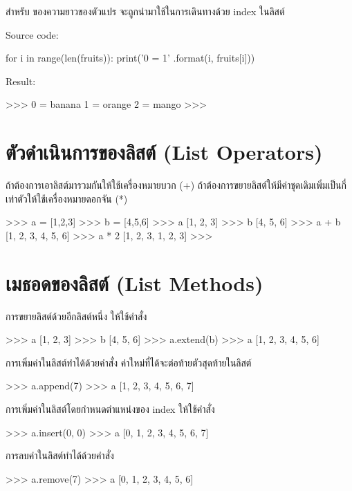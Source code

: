 สำหรับ   ของความยาวของตัวแปร จะถูกนำมาใช้ในการเดินทางด้วย index ในลิสต์

Source code:
\begin{codelist}{}{}
for i in range(len(fruits)):
    print('{0} = {1}' .format(i, fruits[i]))
\end{codelist}

Result:
\begin{codelist}{}{}
>>>
0 = banana
1 = orange
2 = mango
>>>
\end{codelist}

\section{ตัวดำเนินการของลิสต์ (List Operators)}

ถ้าต้องการเอาลิสต์มารวมกันให้ใช้เครื่องหมายบวก (+) ถ้าต้องการขยายลิสต์ให้มีค่าชุดเดิมเพิ่มเป็นกี่เท่าตัวให้ใช้เครื่องหมายดอกจัน (*)

\begin{codelist}{}{}
>>> a = [1,2,3]
>>> b = [4,5,6]
>>> a
[1, 2, 3]
>>> b
[4, 5, 6]
>>> a + b
[1, 2, 3, 4, 5, 6]
>>> a * 2
[1, 2, 3, 1, 2, 3]
>>>
\end{codelist}


\section{เมธอดของลิสต์ (List Methods)}

การขยายลิสต์ด้วยอีกลิสต์หนึ่ง ให้ใช้คำสั่ง  
\begin{codelist}{}{}
>>> a
[1, 2, 3]
>>> b
[4, 5, 6]
>>> a.extend(b)
>>> a
[1, 2, 3, 4, 5, 6]
\end{codelist}

การเพิ่มค่าในลิสต์ทำได้ด้วยคำสั่ง   ค่าใหม่ที่ได้จะต่อท้ายตัวสุดท้ายในลิสต์
\begin{codelist}{}{}
>>> a.append(7)
>>> a
[1, 2, 3, 4, 5, 6, 7]
\end{codelist}


การเพิ่มค่าในลิสต์โดยกำหนดตำแหน่งของ  index ให้ใช้คำสั่ง  
\begin{codelist}{}{}
>>> a.insert(0, 0)
>>> a
[0, 1, 2, 3, 4, 5, 6, 7]
\end{codelist}


การลบค่าในลิสต์ทำได้ด้วยคำสั่ง  
\begin{codelist}{}{}
>>> a.remove(7)
>>> a
[0, 1, 2, 3, 4, 5, 6]
\end{codelist}


